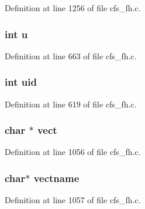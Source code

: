 Definition at line 1256 of file cfs\_\-fh.c.
\subsubsection{\setlength{\rightskip}{0pt plus 5cm}int {\bf u}}\label{cfs__fh_8c_a22}




Definition at line 663 of file cfs\_\-fh.c.
\subsubsection{\setlength{\rightskip}{0pt plus 5cm}int {\bf uid}}\label{cfs__fh_8c_a20}




Definition at line 619 of file cfs\_\-fh.c.
\subsubsection{\setlength{\rightskip}{0pt plus 5cm}char $\ast$ {\bf vect}}\label{cfs__fh_8c_a12}




Definition at line 1056 of file cfs\_\-fh.c.
\subsubsection{\setlength{\rightskip}{0pt plus 5cm}char$\ast$ {\bf vectname}}\label{cfs__fh_8c_a31}




Definition at line 1057 of file cfs\_\-fh.c.